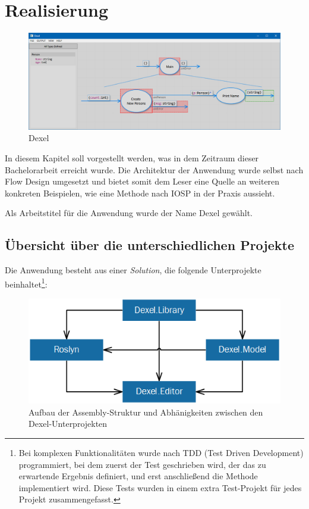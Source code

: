 


\chapter{Realisierung }

	\begin{figure}[H]
		\centering
		\includegraphics[width=1\linewidth]{./img/Dexel.png} 
		\caption{Dexel}
	\end{figure}


In diesem Kapitel soll vorgestellt werden, was in dem Zeitraum dieser
Bachelorarbeit erreicht wurde. Die Architektur der Anwendung wurde selbst nach
Flow Design umgesetzt und bietet somit dem Leser eine Quelle an weiteren
konkreten Beispielen, wie eine Methode nach IOSP in der Praxis aussieht.

Als Arbeitstitel für die Anwendung wurde der Name Dexel gewählt.

\section{Übersicht über die unterschiedlichen Projekte}




Die Anwendung besteht aus einer \textit{Solution}, die folgende Unterprojekte beinhaltet\footnote{Bei komplexen Funktionalitäten wurde nach TDD (Test Driven Development)
	programmiert, bei dem zuerst der Test geschrieben wird, der das zu erwartende
	Ergebnis definiert, und erst anschließend die Methode implementiert wird. Diese Tests wurden in einem extra Test-Projekt für jedes Projekt zusammengefasst.}: 
	\begin{figure}[H]
		\centering
		\includegraphics[width=0.8\linewidth]{./img/Projekte.png} 
		\caption{Aufbau der Assembly-Struktur und Abhänigkeiten zwischen den Dexel-Unterprojekten}
	\end{figure}



